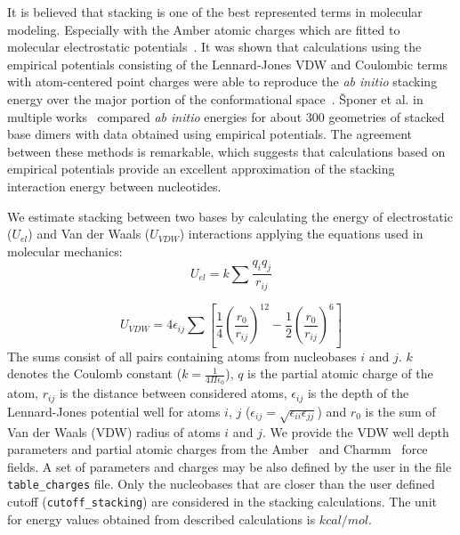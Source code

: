 \documentclass[12pt]{article}
\begin{document}

It is believed that stacking is one of the best represented terms in molecular modeling. 
Especially with the Amber atomic charges which are fitted to molecular electrostatic potentials~\cite{Hobza2008}. It was shown that calculations using the empirical potentials consisting of the Lennard-Jones VDW and Coulombic terms with atom-centered point charges were able to reproduce the {\it ab initio} stacking energy over the major portion of the conformational space~\cite{Leszczynski2002}.
\v{S}poner et al. in multiple works~\cite{Carter2000,Sponer1997, Base1996, Hobza1995} compared {\it ab initio} energies for about 300 geometries of stacked base dimers with data obtained using empirical potentials. The agreement between these methods is remarkable, which suggests that calculations based on empirical potentials provide an excellent approximation of the stacking interaction energy between nucleotides. 

We estimate stacking between two bases by calculating the energy of electrostatic ($U_{el}$) and Van der Waals ($U_{VDW}$) interactions applying the equations used in molecular mechanics:
\begin{equation}
U_{el} = k \sum{\frac{q_i q_j}{r_{ij}}}
\end{equation}

\begin{equation}
U_{VDW} = 4 \epsilon_{ij} \sum{ \left[ \frac{1}{4} {\left( \frac{r_0}{r_{ij}} \right) }^{12} - \frac{1}{2} {\left( \frac{r_0}{r_{ij}} \right) }^{6} \right]}
\end{equation}
The sums consist of all pairs containing atoms from nucleobases $i$ and $j$. $k$ denotes the Coulomb constant ($k = \frac{1}{4 \Pi \epsilon_0}$), $q$ is the partial atomic charge of the atom, $r_{ij}$ is the distance between considered atoms, $\epsilon_{ij}$ is the depth of the Lennard-Jones potential well for atoms $i$, $j$ ($\epsilon_{ij} = \sqrt{\epsilon_{ii}\epsilon_{jj}} $) and $r_0$ is the sum of Van der Waals (VDW) radius of atoms  $i$ and $j$.
We provide the VDW well depth parameters and partial atomic charges from the Amber~\cite{Wang2000} and Charmm~\cite{Mackerell2000,Foloppe2000} force fields. A set of parameters and charges may be also defined by the user in the file \texttt{table\_charges} file. Only the nucleobases that are closer than the user defined cutoff (\texttt{cutoff\_stacking}) are considered in the stacking calculations. The unit for energy values obtained from described calculations is $kcal/mol$. 
\end{document}

